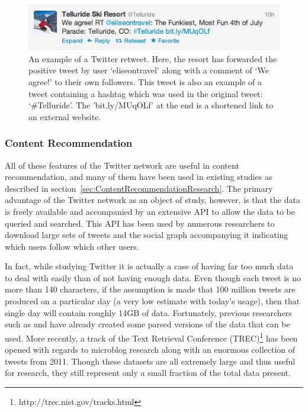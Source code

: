 \begin{center}
\begin{figure}
  \centering
  \includegraphics[width=1\textwidth]{retweet_hashtag_example_figure}
  \caption[Example of a Twitter retweet and hashtag]{An example of a Twitter retweet. Here, the resort has forwarded the positive tweet by user `eliseontravel' along with a comment of `We agree!' to their own followers. This tweet is also an example of a tweet containing a hashtag which was used in the original tweet: `\#Telluride'. The 'bit.ly/MUqOLf' at the end is a shortened link to an external website.}
\label{fig:retweet_hashtag}
\end{figure}
\end{center}


\subsubsection{Content Recommendation}

All of these features of the Twitter network are useful in content recommendation, and many of them have been used in existing studies as described in section~\ref{sec:ContentRecommendationResearch}. The primary advantage of the Twitter network as an object of study, however, is that the data is freely available and accompanied by an extensive API to allow the data to be queried and searched. This API has been used by numerous researchers to download large sets of tweets and the social graph accompanying it indicating which users follow which other users.

In fact, while studying Twitter it is actually a case of having far too much data to deal with easily than of not having enough data. Even though each tweet is no more than 140 characters, if the assumption is made that 100 million tweets are produced on a particular day (a very low estimate with today's usage), then that single day will contain roughly 14GB of data. Fortunately, previous researchers such as \cite{Kwak2010} and \cite{Choudhury2010} have already created some parsed versions of the data that can be used. More recently, a track of the Text Retrieval Conference (TREC)\footnote{http://trec.nist.gov/tracks.html} has been opened with regards to microblog research along with an enormous collection of tweets from 2011. Though these datasets are all extremely large and thus useful for research, they still represent only a small fraction of the total data present.

